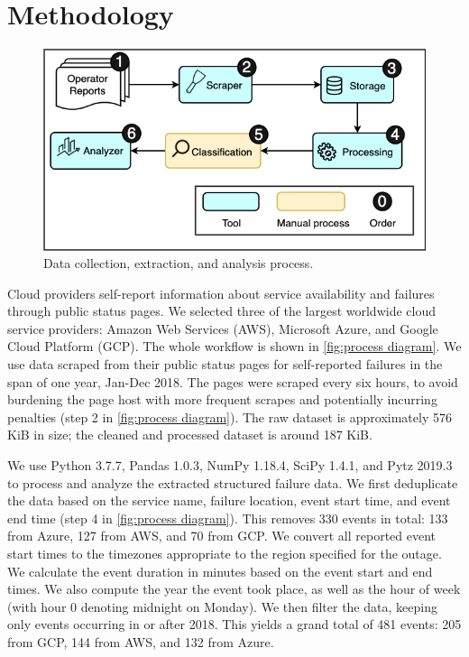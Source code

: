 \section{Methodology}
\begin{figure}[h]
  \centering
  \includegraphics[scale=0.5]{diagrams/process.png}
  \caption{Data collection, extraction, and analysis process.}
  \label{fig:process diagram}
\end{figure}
Cloud providers self-report information about service availability and failures through public status pages.
We selected three of the largest worldwide cloud service providers: Amazon Web Services (AWS), Microsoft Azure, and Google Cloud Platform (GCP).
The whole workflow is shown in \autoref{fig:process diagram}.
We use data scraped from their public status pages for self-reported failures \cite{awsFeed, gcpFeed, azureFeed} in the span of one year, Jan-Dec 2018.
The pages were scraped every six hours, to avoid burdening the page host with more frequent scrapes and potentially incurring penalties (step 2 in \autoref{fig:process diagram}).
The raw dataset is approximately 576 KiB in size; the cleaned and processed dataset is around 187 KiB.

We use Python 3.7.7, Pandas 1.0.3, NumPy 1.18.4, SciPy 1.4.1, and Pytz 2019.3 to process and analyze the extracted structured failure data.
We first deduplicate the data based on the service name, failure location, event start time, and event end time (step 4 in \autoref{fig:process diagram}).
This removes 330 events in total: 133 from Azure, 127 from AWS, and 70 from GCP.
We convert all reported event start times to the timezones appropriate to the region specified for the outage.
We calculate the event duration in minutes based on the event start and end times.
We also compute the year the event took place, as well as the hour of week (with hour 0 denoting midnight on Monday).
We then filter the data, keeping only events occurring in or after 2018. %
This yields a grand total of 481 events: 205 from GCP, 144 from AWS, and 132 from Azure.

